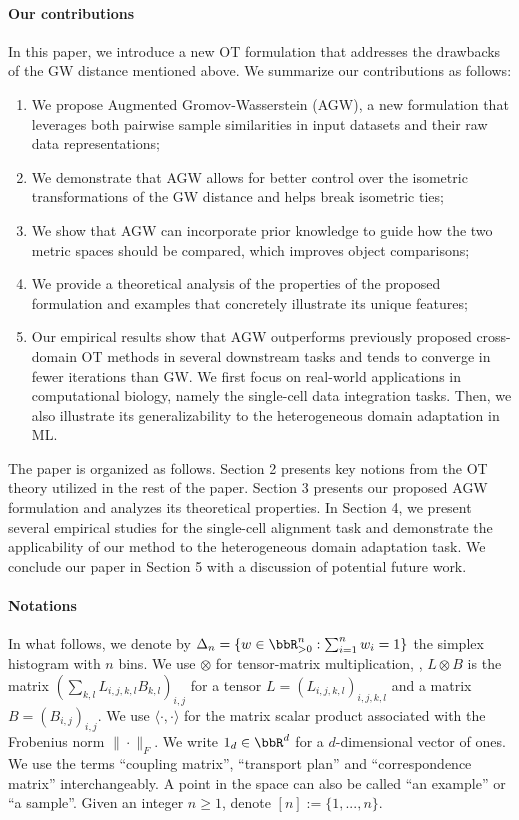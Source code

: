 \paragraph{Our contributions}
In this paper, we introduce a new OT formulation that addresses the drawbacks of the
GW distance mentioned above. We summarize our contributions as follows:
\begin{enumerate}
    \item We propose Augmented Gromov-Wasserstein (AGW), a new formulation that leverages
    both pairwise sample similarities in input datasets and their raw data representations;
    \item We demonstrate that AGW allows for better control over the isometric transformations
    of the GW distance and helps break isometric ties;
    \item We show that AGW can incorporate prior knowledge to guide how the two metric spaces
    should be compared, which improves object comparisons; %
    \item We provide a theoretical analysis of the properties of the proposed formulation
    and examples that concretely illustrate its unique features;
    \item Our empirical results show that AGW outperforms previously proposed
    cross-domain OT methods in several downstream tasks and tends to converge in fewer iterations
    than GW. We first focus on real-world applications in computational biology,
    namely the single-cell data integration tasks. Then, we also illustrate its generalizability
    to the heterogeneous domain adaptation in ML.
\end{enumerate}
The paper is organized as follows. Section 2 presents key notions from the OT theory
utilized in the rest of the paper. Section 3 presents our proposed AGW formulation and
analyzes its theoretical properties. In Section 4, we present several empirical studies
for the single-cell alignment task and demonstrate the applicability of our method to
the heterogeneous domain adaptation task. We conclude our paper in Section 5 with
a discussion of potential future work.

\paragraph{Notations} In what follows, we denote by
$\Delta_{n}=\{ w \in \bbR_{> 0}^n: \sum_{i=1}^{n} w_{i}=1\}$
the simplex histogram with $n$ bins. We use $\otimes$ for tensor-matrix multiplication,
\ie, $L \otimes B$ is the matrix $(\sum_{k,l} L_{i,j,k,l} B_{k,l})_{i,j}$ for a tensor
$L =(L_{i,j,k,l})_{i,j,k,l}$ and a matrix $B = (B_{i,j})_{i,j}$.
We use $\langle \cdot, \cdot \rangle$ for the matrix scalar product associated with
the Frobenius norm $\|\cdot\|_{F}$. We write $1_d \in \bbR^d$ for a
$d$-dimensional vector of ones. We use the terms ``coupling matrix'', ``transport plan''
and ``correspondence matrix'' interchangeably.
A point in the space can also be called ``an example'' or ``a sample''.
Given an integer $n \geq 1$, denote $[n] := \{ 1, ..., n\}$.

